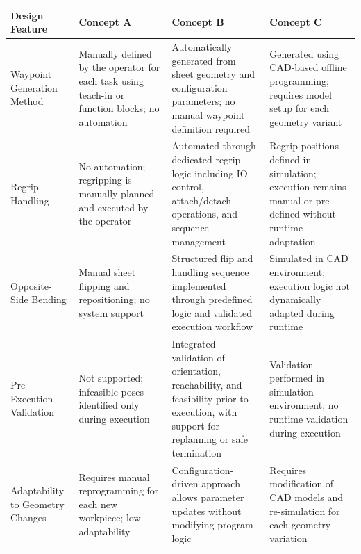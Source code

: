 \begin{landscape}
\begin{table}[htbp]
\centering
\normalsize
\setlength{\tabcolsep}{3pt}
\renewcommand{\arraystretch}{0.92}
\begin{tabularx}{\linewidth}{L{3.6cm} L{5.1cm} L{6.8cm} L{5.8cm}}
\toprule
\textbf{Design Feature} &
\textbf{Concept A} &
\textbf{Concept B} &
\textbf{Concept C} \\
\midrule
 
Waypoint Generation Method &
Manually defined by the operator for each task using teach-in or function blocks; no automation \cite{Siciliano2016Robotics} &
Automatically generated from sheet geometry and configuration parameters; no manual waypoint definition required \cite{dragandbot_anyrobot_2025} &
Generated using CAD-based offline programming; requires model setup for each geometry variant \cite{Pan2012Survey} \\
 
Regrip Handling &
No automation; regripping is manually planned and executed by the operator \cite{Aomura2002RoboticBending} &
Automated through dedicated regrip logic including IO control, attach/detach operations, and sequence management \cite{Aomura2002RoboticBending,Gupta1998SheetMetalBending} &
Regrip positions defined in simulation; execution remains manual or pre-defined without runtime adaptation \cite{Bar2018VirtualCommissioning} \\
 
Opposite-Side Bending &
Manual sheet flipping and repositioning; no system support &
Structured flip and handling sequence implemented through predefined logic and validated execution workflow \cite{Gupta1998SheetMetalBending} &
Simulated in CAD environment; execution logic not dynamically adapted during runtime \cite{Bar2018VirtualCommissioning} \\
 
Pre-Execution Validation &
Not supported; infeasible poses identified only during execution \cite{Siciliano2016Robotics} &
Integrated validation of orientation, reachability, and feasibility prior to execution, with support for replanning or safe termination &
Validation performed in simulation environment; no runtime validation during execution \cite{Pan2012Survey} \\
 
Adaptability to Geometry Changes &
Requires manual reprogramming for each new workpiece; low adaptability \cite{Pan2012Survey} &
Configuration-driven approach allows parameter updates without modifying program logic &
Requires modification of CAD models and re-simulation for each geometry variation \cite{Bar2018VirtualCommissioning} \\
 

\end{tabularx}
\end{table}
\end{landscape}
